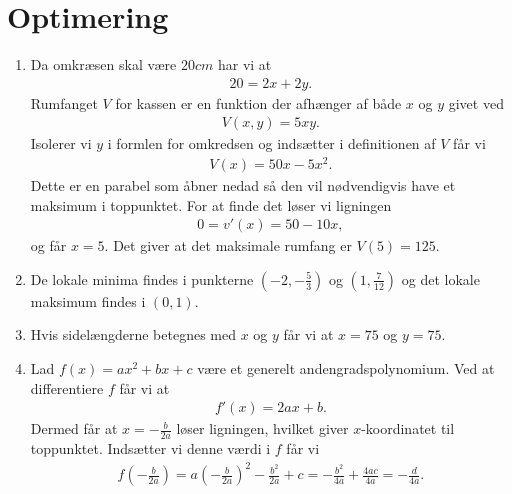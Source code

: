 \newpage
\section{Optimering}
\begin{enumerate}
	
	
	\item Da omkræsen skal være $20cm$ har vi at
	\begin{align*}
	20=2x+2y.
	\end{align*}
	Rumfanget $V$ for kassen er en funktion der afhænger af både $x$ og $y$ givet ved
	\begin{align*}
	V(x,y)=5xy.
	\end{align*}
	Isolerer vi $y$ i formlen for omkredsen og indsætter i definitionen af $V$ får vi
	\begin{align*}
	V(x)=50x-5x^2.
	\end{align*}
	Dette er en parabel som åbner nedad så den vil nødvendigvis have et maksimum i toppunktet. For at finde det løser vi ligningen
	\begin{align*}
	0=v'(x)=50-10x,
	\end{align*}
	og får $x=5$. Det giver at det maksimale rumfang er $ V(5)=125 $.
	
	\item De lokale minima findes i punkterne $(-2,-\frac{5}{3})$ og $(1,\frac{7}{12})$ og det lokale maksimum findes i $(0,1)$.
	
	\item Hvis sidelængderne betegnes med $x$ og $y$ får vi at $x=75$ og $y=75$.
	
	\item Lad $f(x)=ax^2+bx+c$ være et generelt andengradspolynomium. Ved at differentiere $f$ får vi at
	\begin{align*}
	f'(x)=2ax+b.
	\end{align*}
	Dermed får at $x=-\frac{b}{2a}$ løser ligningen, hvilket giver $x$-koordinatet til toppunktet. Indsætter vi denne værdi i $f$ får vi
	\begin{align*}
	f(-\frac{b}{2a})=a(-\frac{b}{2a})^2-\frac{b^2}{2a}+c=-\frac{b^2}{4a}+\frac{4ac}{4a}=-\frac{d}{4a}.
	\end{align*}
	

\end{enumerate}
